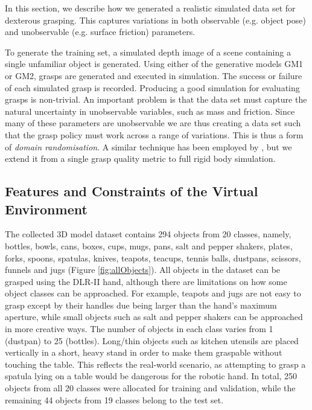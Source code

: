 In this section, we describe how we generated a realistic simulated data set for dexterous grasping. This captures variations in both observable (e.g. object pose) and unobservable (e.g. surface friction) parameters.

To generate the training set, a simulated depth image of a scene containing a single unfamiliar object is generated. Using either of the generative models GM1 or GM2, grasps are generated and executed in simulation. The success or failure of each simulated grasp is recorded. Producing a good simulation for evaluating grasps is non-trivial. An important problem is that the data set must capture the natural uncertainty in unobservable variables, such as mass and friction. Since many of these parameters are unobservable we are thus creating a data set such that the grasp policy must work across a range of variations. This is thus a form of {\em domain randomisation}. A similar technique has been employed by \cite{mahler2017dex}, but we extend it from a single grasp quality metric to full rigid body simulation.

\subsection{Features and Constraints of the Virtual Environment}
\label{subsection:environment}

The collected 3D model dataset contains 294 objects from 20 classes, namely, bottles, bowls, cans, boxes, cups, mugs, pans, salt and pepper shakers, plates, forks, spoons, spatulas, knives, teapots, teacups, tennis balls, dustpans, scissors, funnels and jugs (Figure \ref{fig:allObjects}). All objects in the dataset can be grasped using the DLR-II hand, although there are limitations on how some object classes can be approached. For example, teapots and jugs are not easy to grasp except by their handles due being larger than the hand's maximum aperture, while small objects such as salt and pepper shakers can be approached in more creative ways. The number of objects in each class varies from 1 (dustpan) to 25 (bottles). Long/thin objects such as kitchen utensils are placed vertically in a short, heavy stand in order to make them graspable without touching the table. This reflects the real-world scenario, as attempting to grasp a spatula lying on a table would be dangerous for the robotic hand. In total, 250 objects from all 20 classes were allocated for training and validation, while the remaining 44 objects from 19 classes belong to the test set.

